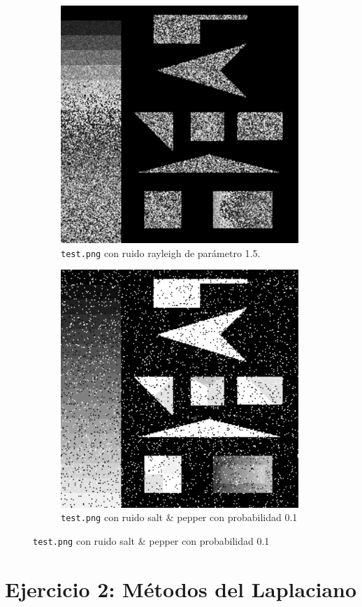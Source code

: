 \documentclass[11pt, spanish]{article}
\begin{document}
\begin{figure}[H]
\centering
\begin{subfigure}{0.5\linewidth}
\centering
  \includegraphics[height=9cm]{ej1-imgs/test-rayleigh15.png}
  \caption{\footnotesize{\texttt{test.png} con ruido rayleigh de parámetro 1.5.}}
\end{subfigure}%
\begin{subfigure}{0.5\linewidth}
\centering
  \includegraphics[height=9cm]{ej1-imgs/test-saltpepper10.png}
  \caption{\footnotesize{\texttt{test.png} con ruido salt \& pepper con probabilidad 0.1}}
\end{subfigure}
\end{figure}


\newpage
\section{Ejercicio 2: Métodos del Laplaciano}
\end{document}
